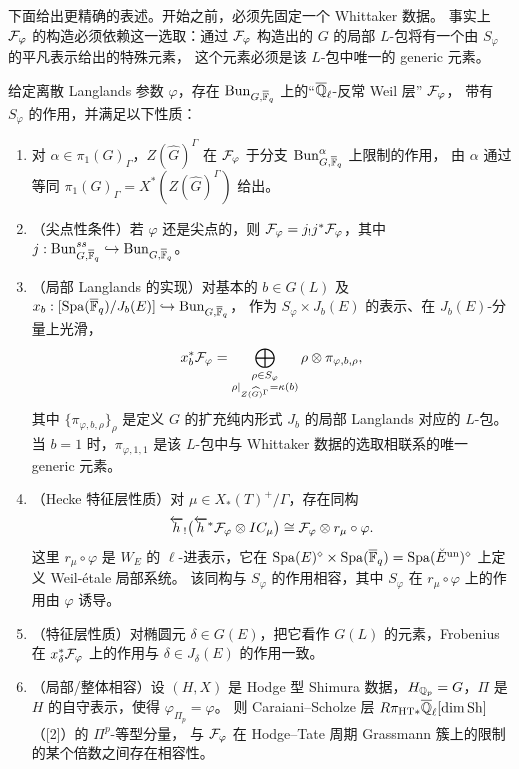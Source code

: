 下面给出更精确的表述。开始之前，必须先固定一个 Whittaker 数据。
事实上 $\mathcal{F}_\varphi$ 的构造必须依赖这一选取：通过 $\mathcal{F}_\varphi$ 构造出的 $G$ 的局部 $L$-包将有一个由 $S_\varphi$ 的平凡表示给出的特殊元素，
这个元素必须是该 $L$-包中唯一的 generic 元素。

\begin{conjecture}\label{conj:4.4}
给定离散 Langlands 参数 $\varphi$，存在 $\mathrm{Bun}_{G,\overline{\mathbb{F}}_q}$ 上的“$\overline{\mathbb{Q}}_\ell$-反常 Weil 层” $\mathcal{F}_\varphi$，
带有 $S_\varphi$ 的作用，并满足以下性质：
\begin{enumerate}[label=(\arabic*)]
\item 对 $\alpha\in\pi_1(G)_\Gamma$，$Z(\widehat{G})^\Gamma$ 在 $\mathcal{F}_\varphi$ 于分支 $\mathrm{Bun}_{G,\overline{\mathbb{F}}_q}^\alpha$ 上限制的作用，
  由 $\alpha$ 通过等同 $\pi_1(G)_\Gamma=X^*(Z(\widehat{G})^\Gamma)$ 给出。
\item（尖点性条件）若 $\varphi$ 还是尖点的，则 $\mathcal{F}_\varphi=j_!j^*\mathcal{F}_\varphi$，其中 $j:\mathrm{Bun}_{G,\overline{\mathbb{F}}_q}^{ss}\hookrightarrow\mathrm{Bun}_{G,\overline{\mathbb{F}}_q}$。
\item（局部 Langlands 的实现）对基本的 $b\in G(L)$ 及 $x_b:[\mathrm{Spa}(\overline{\mathbb{F}}_q)/J_b(E)]\hookrightarrow\mathrm{Bun}_{G,\overline{\mathbb{F}}_q}$，
  作为 $S_\varphi\times J_b(E)$ 的表示、在 $J_b(E)$-分量上光滑，
  \[
  x_b^*\mathcal{F}_\varphi=\bigoplus_{\substack{\rho\in S_\varphi\\ \rho|_{Z(\widehat{G})^\Gamma}=\kappa(b)}}\rho\otimes\pi_{\varphi,b,\rho},
  \]
  其中 $\{\pi_{\varphi,b,\rho}\}_\rho$ 是定义 $G$ 的扩充纯内形式 $J_b$ 的局部 Langlands 对应的 $L$-包。
  当 $b=1$ 时，$\pi_{\varphi,1,1}$ 是该 $L$-包中与 Whittaker 数据的选取相联系的唯一 generic 元素。
\item（Hecke 特征层性质）对 $\mu\in X_*(T)^+/\Gamma$，存在同构
  \[
  \overleftarrow{h}_!\big(\overleftarrow{h}^*\mathcal{F}_\varphi\otimes IC_\mu\big)\cong\mathcal{F}_\varphi\otimes r_\mu\circ\varphi.
  \]
  这里 $r_\mu\circ\varphi$ 是 $W_E$ 的 $\ell$-进表示，它在 $\mathrm{Spa}(E)^\diamond\times\mathrm{Spa}(\overline{\mathbb{F}}_q)=\mathrm{Spa}(\breve E^{\mathrm{un}})^\diamond$ 上定义 Weil-étale 局部系统。
  该同构与 $S_\varphi$ 的作用相容，其中 $S_\varphi$ 在 $r_\mu\circ\varphi$ 上的作用由 $\varphi$ 诱导。
\item（特征层性质）对椭圆元 $\delta\in G(E)$，把它看作 $G(L)$ 的元素，Frobenius 在 $x_\delta^*\mathcal{F}_\varphi$ 上的作用与 $\delta\in J_\delta(E)$ 的作用一致。
\item（局部/整体相容）设 $(H,X)$ 是 Hodge 型 Shimura 数据，$H_{\mathbb{Q}_p}=G$，$\Pi$ 是 $H$ 的自守表示，使得 $\varphi_{\Pi_p}=\varphi$。
  则 Caraiani–Scholze 层 $R\pi_{\mathrm{HT}*}\overline{\mathbb{Q}}_\ell[\dim\mathrm{Sh}]$（[2]）的 $\Pi^p$-等型分量，
  与 $\mathcal{F}_\varphi$ 在 Hodge–Tate 周期 Grassmann 簇上的限制的某个倍数之间存在相容性。
\end{enumerate}
\end{conjecture}

